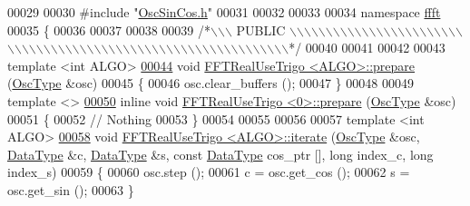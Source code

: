\begin{DoxyCode}
00029 
00030 \textcolor{preprocessor}{#include    "\hyperlink{a00111}{OscSinCos.h}"}
00031 
00032 
00033 
00034 \textcolor{keyword}{namespace }\hyperlink{a00142}{ffft}
00035 \{
00036 
00037 
00038 
00039 \textcolor{comment}{/*\(\backslash\)\(\backslash\)\(\backslash\) PUBLIC \(\backslash\)\(\backslash\)\(\backslash\)\(\backslash\)\(\backslash\)\(\backslash\)\(\backslash\)\(\backslash\)\(\backslash\)\(\backslash\)\(\backslash\)\(\backslash\)\(\backslash\)\(\backslash\)\(\backslash\)\(\backslash\)\(\backslash\)\(\backslash\)\(\backslash\)\(\backslash\)\(\backslash\)\(\backslash\)\(\backslash\)\(\backslash\)\(\backslash\)\(\backslash\)\(\backslash\)\(\backslash\)\(\backslash\)\(\backslash\)\(\backslash\)\(\backslash\)\(\backslash\)\(\backslash\)\(\backslash\)\(\backslash\)\(\backslash\)\(\backslash\)\(\backslash\)\(\backslash\)\(\backslash\)\(\backslash\)\(\backslash\)\(\backslash\)\(\backslash\)\(\backslash\)\(\backslash\)\(\backslash\)\(\backslash\)\(\backslash\)\(\backslash\)\(\backslash\)\(\backslash\)\(\backslash\)\(\backslash\)\(\backslash\)\(\backslash\)\(\backslash\)\(\backslash\)\(\backslash\)\(\backslash\)\(\backslash\)\(\backslash\)*/}
00040 
00041 
00042 
00043 \textcolor{keyword}{template} <\textcolor{keywordtype}{int} ALGO>
\hypertarget{a00107_source_l00044}{}\hyperlink{a00016_a302dedbe349e8d17efd561a8f59ab69d}{00044} \textcolor{keywordtype}{void}    \hyperlink{a00016}{FFTRealUseTrigo <ALGO>::prepare} (\hyperlink{a00020}{OscType} &osc)
00045 \{
00046     osc.clear\_buffers ();
00047 \}
00048 
00049 \textcolor{keyword}{template} <>
\hypertarget{a00107_source_l00050}{}\hyperlink{a00016_a073404724fb350c173bd22ba9151c6d2}{00050} \textcolor{keyword}{inline} \textcolor{keywordtype}{void} \hyperlink{a00016}{FFTRealUseTrigo <0>::prepare} (\hyperlink{a00020}{OscType} &osc)
00051 \{
00052     \textcolor{comment}{// Nothing}
00053 \}
00054 
00055 
00056 
00057 \textcolor{keyword}{template} <\textcolor{keywordtype}{int} ALGO>
\hypertarget{a00107_source_l00058}{}\hyperlink{a00016_aaf6165f8f57b4620860a5f427fbdf38e}{00058} \textcolor{keywordtype}{void}    \hyperlink{a00016}{FFTRealUseTrigo <ALGO>::iterate} (\hyperlink{a00020}{OscType} &osc, 
      \hyperlink{a00016_a2a3c2e9635f2b74cd98df7923ebf0850}{DataType} &c, \hyperlink{a00016_a2a3c2e9635f2b74cd98df7923ebf0850}{DataType} &s, \textcolor{keyword}{const} \hyperlink{a00016_a2a3c2e9635f2b74cd98df7923ebf0850}{DataType} cos\_ptr [], \textcolor{keywordtype}{long} index\_c, \textcolor{keywordtype}{long} index\_s)
00059 \{
00060     osc.step ();
00061     c = osc.get\_cos ();
00062     s = osc.get\_sin ();
00063 \}

\end{DoxyCode}
